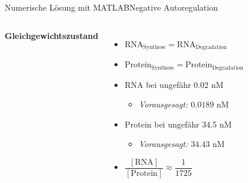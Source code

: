 \documentclass[11pt,aspectratio=169,reqno]{beamer}
\begin{document}
\begin{frame}{Numerische Lösung mit MATLAB\hfill {\small \textcolor{ETHBlue}{Negative Autoregulation}}}
    \begin{columns}
            \textbf{Gleichgewichtszustand}\\[1em]
            
            \begin{itemize}
                \item $\text{RNA}_\text{Synthese}=\text{RNA}_\text{Degradation}$
                \item $\text{Protein}_\text{Synthese}=\text{Protein}_\text{Degradation}$
                \vspace{1em}
                \item RNA bei ungefähr 0.02 nM
                \begin{itemize}
                    \item \emph{\tiny Vorausgesagt: $0.0189\text{ nM}$}
                \end{itemize}
                \item Protein bei ungefähr 34.5 nM
                \begin{itemize}
                    \item \emph{\tiny Vorausgesagt: $34.43\text{ nM}$}
                \end{itemize}

                \item $\dfrac{[\text{RNA}]}{[\text{Protein}]}\approx \dfrac{1}{1725}$
            \end{itemize}
        
        \begin{figure}
            \centering
            \includegraphics[width=\linewidth]{images/simulations/negative_autoregulation_basic.m.png}
        \end{figure}
    \end{columns}
\end{frame}
\end{document}
